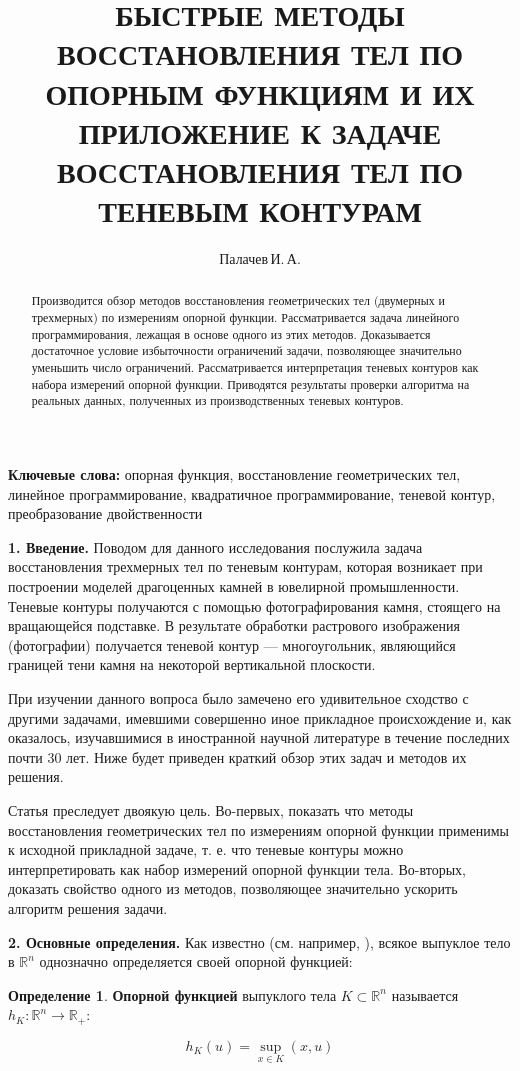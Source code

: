 \documentclass[a4paper, 10pt]{article}
\title{БЫСТРЫЕ МЕТОДЫ ВОССТАНОВЛЕНИЯ ТЕЛ ПО ОПОРНЫМ ФУНКЦИЯМ И ИХ ПРИЛОЖЕНИЕ К
ЗАДАЧЕ ВОССТАНОВЛЕНИЯ ТЕЛ ПО ТЕНЕВЫМ КОНТУРАМ}
\author{Палачев\,И.\,А.}
\theoremstyle{definition}
\newtheorem{SmartDefinition}{Определение}
\theoremstyle{plain}
\theoremstyle{plain}
\begin{document}
\maketitle
\begin{abstract}
 Производится обзор методов восстановления геометрических тел (двумерных и
 трехмерных) по измерениям опорной функции. Рассматривается задача линейного
 программирования, лежащая в основе одного из этих методов. Доказывается
 достаточное условие избыточности ограничений задачи, позволяющее значительно
 уменьшить число ограничений. Рассматривается интерпретация теневых контуров
 как набора измерений опорной функции. Приводятся результаты проверки
 алгоритма на реальных данных, полученных из производственных теневых контуров.
\end{abstract}

\textbf{Ключевые слова:} опорная функция, восстановление геометрических тел,
линейное программирование, квадратичное программирование, теневой контур,
преобразование двойственности

\textbf{1. Введение.} Поводом для данного исследования послужила задача
восстановления трехмерных тел по теневым контурам, которая возникает при
построении моделей драгоценных камней в ювелирной промышленности. Теневые
контуры получаются с помощью фотографирования камня, стоящего на вращающейся
подставке. В результате обработки растрового изображения (фотографии) получается
теневой контур --- многоугольник, являющийся границей тени камня на некоторой
вертикальной плоскости.

При изучении данного вопроса было замечено его удивительное сходство с другими
задачами, имевшими совершенно иное прикладное происхождение и, как оказалось,
изучавшимися в иностранной научной литературе в течение последних почти 30 лет.
Ниже будет приведен краткий обзор этих задач и методов их решения.

Статья преследует двоякую цель. Во-первых, показать что методы
восстановления геометрических тел по измерениям опорной функции применимы к
исходной прикладной задаче, т. е. что теневые контуры можно интерпретировать
как набор измерений опорной функции тела. Во-вторых, доказать свойство
одного из методов, позволяющее значительно ускорить алгоритм решения задачи.

\textbf{2. Основные определения.} Как известно (см. например,
\cite{Ghosh:1998:SFR:307150.307167}), всякое выпуклое тело в $\mathbb{R}^{n}$
однозначно определяется своей опорной функцией:

\begin{SmartDefinition}
 \label{def:support-function}
 \textbf{Опорной функцией} выпуклого тела $K \subset \mathbb{R}^{n}$
 называется
 $h_{K}: \mathbb{R}^{n} \to \mathbb{R}_{+}$:

 \begin{equation}h_{K}(u) = \sup \limits_{x \in K}(x, u)\end{equation}
\end{SmartDefinition}
\end{document}
